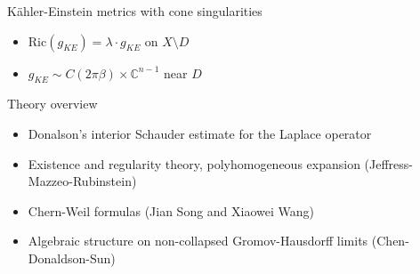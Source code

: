 \documentclass{beamer}
\newcommand{\C}{\mathbb{C}}
\begin{document}
\begin{frame}{K\"ahler-Einstein metrics with cone singularities}
\begin{center}
{
		}
	\end{center}



\begin{itemize}
	\centering
	\item \(\mbox{Ric}(g_{KE}) = \lambda \cdot g_{KE}\) on \(X \setminus D\)
	\item \(g_{KE} \sim C(2\pi\beta) \times  \C^{n-1}\) near \(D\)
\end{itemize}


\end{frame}

\begin{frame}{Theory overview}
	\begin{itemize}
		\setlength{\itemsep}{\fill}
		\item Donalson's interior Schauder estimate for the Laplace operator
		\item Existence and regularity theory, polyhomogeneous expansion (Jeffress-Mazzeo-Rubinstein)
		\item Chern-Weil formulas (Jian Song and Xiaowei Wang)
		\item Algebraic structure on non-collapsed Gromov-Hausdorff limits (Chen-Donaldson-Sun)
	\end{itemize}
\end{frame}
\end{document}
